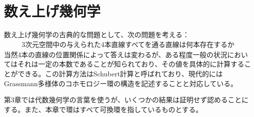 \documentclass{ltjsreport}
\begin{document}
  \chapter{数え上げ幾何学}

  数え上げ幾何学の古典的な問題として、次の問題を考える：
  \begin{align*}
    \text{3次元空間中の与えられた4本直線すべてを通る直線は何本存在するか}
  \end{align*}
  当然4本の直線の位置関係によって答えは変わるが、ある程度一般の状況においてはそれは一定の本数であることが知られており、その値を具体的に計算することができる。この計算方法はSchubert計算と呼ばれており、現代的にはGrassmann多様体のコホモロジー環の構造を記述することと対応している。

  第3章では代数幾何学の言葉を使うが、いくつかの結果は証明せず認めることにする。また、本章で環はすべて可換環を指しているものとする。

  

  

  
\end{document}
